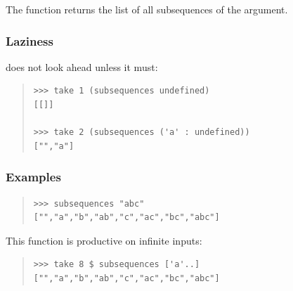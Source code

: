 \begin{haddockdesc}
\item[\begin{tabular}{@{}l}
subsequences :: {\char 91}a{\char 93} -> {\char 91}{\char 91}a{\char 93}{\char 93}
\end{tabular}]
{\haddockbegindoc
The  function returns the list of all subsequences of the argument.\par
\subsubsection*{\textbf{Laziness}}
 does not look ahead unless it must:\par
\begin{quote}
{\haddockverb\begin{verbatim}
>>> take 1 (subsequences undefined)
[[]]

>>> take 2 (subsequences ('a' : undefined))
["","a"]

\end{verbatim}}
\end{quote}
\subsubsection*{\textbf{Examples}}
\begin{quote}
{\haddockverb\begin{verbatim}
>>> subsequences "abc"
["","a","b","ab","c","ac","bc","abc"]

\end{verbatim}}
\end{quote}
This function is productive on infinite inputs:\par
\begin{quote}
{\haddockverb\begin{verbatim}
>>> take 8 $ subsequences ['a'..]
["","a","b","ab","c","ac","bc","abc"]

\end{verbatim}}
\end{quote}}
\end{haddockdesc}
